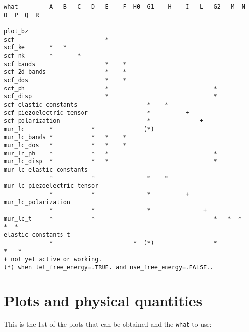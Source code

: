 \documentclass[12pt,a4paper,twoside]{report}
\begin{document}
\begin{footnotesize}
\begin{verbatim}
what         A   B   C   D   E    F  H0  G1    H    I   L   G2   M  N  O  P  Q  R

plot_bz
scf                          *
scf_ke       *   *
scf_nk       *       *
scf_bands                    *    *
scf_2d_bands                 *    *
scf_dos                      *    *
scf_ph                       *                              *
scf_disp                     *                              *
scf_elastic_constants                    *    *
scf_piezoelectric_tensor                 *          +
scf_polarization                         *              +
mur_lc       *           *              (*)
mur_lc_bands *           *   *    *
mur_lc_dos   *           *   *    *
mur_lc_ph    *           *   *                              *
mur_lc_disp  *           *   *                              *
mur_lc_elastic_constants
             *           *               *    *
mur_lc_piezoelectric_tensor
             *           *               *          +
mur_lc_polarization
             *           *               *               +
mur_lc_t     *           *                                  *   *  *  *  *
elastic_constants_t
             *                       *  (*)                 *               *   *
+ not yet active or working.
(*) when lel_free_energy=.TRUE. and use_free_energy=.FALSE.. 
\end{verbatim}
\end{footnotesize}

\newpage
{\color{dark-blue}\chapter{Plots and physical quantities}}
\color{black}
This is the list of the plots that can be obtained and 
the \texttt{what} to use:
\end{document}
